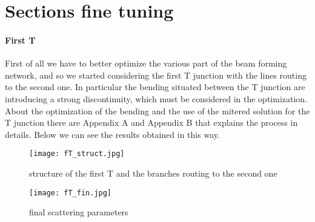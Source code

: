 \section{Sections fine tuning}
\paragraph{First T}
First of all we have to better optimize the various part of the beam forming network, and so we started considering the first T junction with the lines routing to the second one. In particular the bending situated between the T junction are introducing a strong discontinuity, which must be considered in the optimization. About the optimization of the bending and the use of the mitered solution for the T junction there are Appendix A and Appendix B that explains the process in details. Below we can see the results obtained in this way.
\begin{figure}[H]
	\centering
	\texttt{[image: fT\_struct.jpg]}
	\caption{structure of the first T and the branches routing to the second one}
	\label{fT_struct}
\end{figure}
\begin{figure}[H]
	\centering
	\texttt{[image: fT\_fin.jpg]}
	\caption{final scattering parameters}
	\label{fT_fin}
\end{figure}

